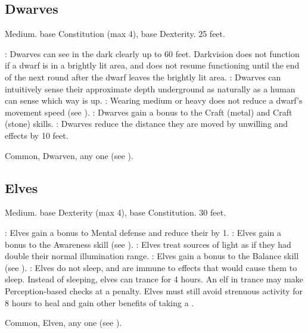     \subsection{Dwarves}
         Medium.
          base Constitution (max 4),  base Dexterity.
         25 feet.
        \begin{itemize}
            : Dwarves can see in the dark clearly up to 60 feet. Darkvision does not function if a dwarf is in a brightly lit area, and does not resume functioning until the end of the next round after the dwarf leaves the brightly lit area.
            : Dwarves can intuitively sense their approximate depth underground as naturally as a human can sense which way is up.
            : Wearing medium or heavy  does not reduce a dwarf's movement speed (see ).
            : Dwarves gain a  bonus to the Craft (metal) and Craft (stone) skills.
            : Dwarves reduce the distance they are moved by unwilling  and  effects by 10 feet.
        \end{itemize}
         Common, Dwarven, any one  (see ).

    \subsection{Elves}
         Medium.
          base Dexterity (max 4),  base Constitution.
         30 feet.
        \begin{itemize}
            : Elves gain a  bonus to Mental defense and reduce their  by 1.
            : Elves gain a  bonus to the Awareness skill (see ).
            : Elves treat sources of light as if they had double their normal illumination range.
            : Elves gain a  bonus to the Balance skill (see ).
            : Elves do not sleep, and are immune to  effects that would cause them to sleep.
                Instead of sleeping, elves can trance for 4 hours.
                An elf in trance may make Perception-based checks at a  penalty.
                Elves must still avoid strenuous activity for 8 hours to heal and gain other benefits of taking a .
        \end{itemize}
         Common, Elven, any one  (see ).

